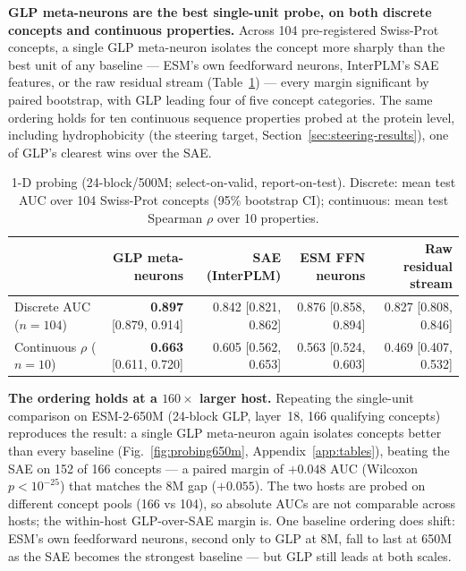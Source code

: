 \documentclass{article}
\begin{document}
\textbf{GLP meta-neurons are the best single-unit probe, on both discrete concepts and
continuous properties.} Across 104 pre-registered Swiss-Prot concepts, a single GLP meta-neuron
isolates the concept more sharply than the best unit of any baseline --- ESM's own feedforward
neurons, InterPLM's SAE features, or the raw residual stream (Table~\ref{tab:probing}) --- every
margin significant by paired bootstrap, with GLP leading four of five concept categories. The
same ordering holds for ten continuous sequence properties probed at the protein level,
including hydrophobicity (the steering target, Section~\ref{sec:steering-results}), one of GLP's
clearest wins over the SAE.

\begin{table}[t]
\centering
\caption{1-D probing (24-block/500M; select-on-valid, report-on-test). Discrete: mean test AUC
over 104 Swiss-Prot concepts (95\% bootstrap CI); continuous: mean test Spearman $\rho$ over 10
properties.}
\label{tab:probing}
\begin{tabular}{lrrrr}
\toprule
 & GLP meta-neurons & SAE (InterPLM) & ESM FFN neurons & Raw residual stream \\
\midrule
Discrete AUC ($n{=}104$)   & \textbf{0.897} [0.879, 0.914] & 0.842 [0.821, 0.862] & 0.876 [0.858, 0.894] & 0.827 [0.808, 0.846] \\
Continuous $\rho$ ($n{=}10$) & \textbf{0.663} [0.611, 0.720] & 0.605 [0.562, 0.653] & 0.563 [0.524, 0.603] & 0.469 [0.407, 0.532] \\
\bottomrule
\end{tabular}
\end{table}

\textbf{The ordering holds at a $160{\times}$ larger host.} Repeating the single-unit
comparison on ESM-2-650M (24-block GLP, layer~18, 166 qualifying concepts) reproduces the
result: a single GLP meta-neuron again isolates concepts better than every baseline
(Fig.~\ref{fig:probing650m}, Appendix~\ref{app:tables}), beating the SAE on 152 of 166 concepts --- a paired margin of
$+0.048$ AUC (Wilcoxon $p{<}10^{-25}$) that matches the 8M gap ($+0.055$). The two hosts are
probed on different concept pools (166 vs 104), so absolute AUCs are not comparable across
hosts; the within-host GLP-over-SAE margin is. One baseline ordering does shift: ESM's own
feedforward neurons, second only to GLP at 8M, fall to last at 650M as the SAE becomes the
strongest baseline --- but GLP still leads at both scales.
\end{document}

